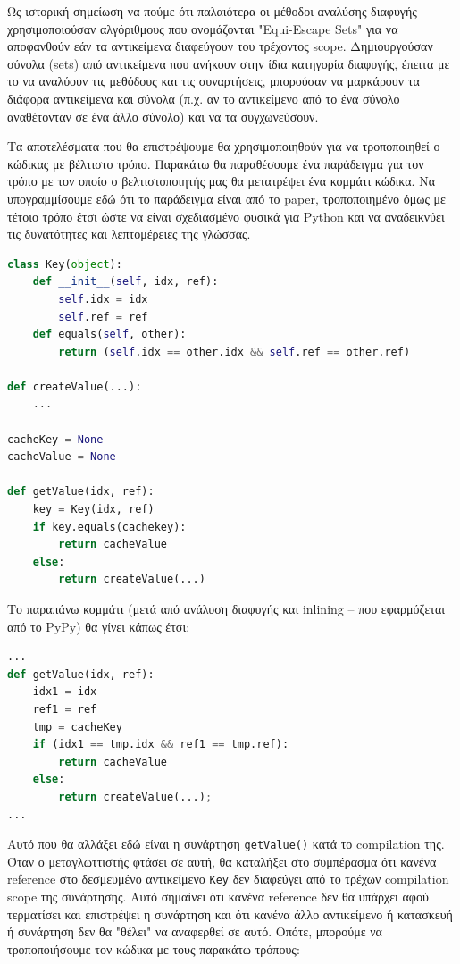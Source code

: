 Ως ιστορική σημείωση να πούμε ότι παλαιότερα οι μέθοδοι αναλύσης διαφυγής
χρησιμοποιούσαν αλγόριθμους που ονομάζονται "Equi-Escape
Sets"\cite{kotzmann2005escape} για να αποφανθούν εάν τα αντικείμενα διαφεύγουν
του τρέχοντος scope. Δημιουργούσαν σύνολα (sets) από αντικείμενα που ανήκουν
στην ίδια κατηγορία διαφυγής, έπειτα με το να αναλύουν τις μεθόδους και τις
συναρτήσεις, μπορούσαν να μαρκάρουν τα διάφορα αντικείμενα και σύνολα (π.χ. αν
το αντικείμενο από το ένα σύνολο αναθέτονταν σε ένα άλλο σύνολο) και να τα
συγχωνεύσουν.\cite{stadler2014partial}

Τα αποτελέσματα που θα επιστρέψουμε θα χρησιμοποιηθούν για να τροποποιηθεί ο
κώδικας με βέλτιστο τρόπο. Παρακάτω θα παραθέσουμε ένα παράδειγμα για τον τρόπο
με τον οποίο ο βελτιστοποιητής μας θα μετατρέψει ένα κομμάτι κώδικα. Να
υπογραμμίσουμε εδώ ότι το παράδειγμα είναι από το paper, τροποποιημένο όμως με
τέτοιο τρόπο έτσι ώστε να είναι σχεδιασμένο φυσικά για Python και να αναδεικνύει
τις δυνατότητες και λεπτομέρειες της γλώσσας.

\begin{lstlisting}[language=Python]
class Key(object):
    def __init__(self, idx, ref):
        self.idx = idx
        self.ref = ref
    def equals(self, other):
        return (self.idx == other.idx && self.ref == other.ref)

def createValue(...):
    ...
        
cacheKey = None
cacheValue = None

def getValue(idx, ref):
    key = Key(idx, ref)
    if key.equals(cachekey):
        return cacheValue
    else:
        return createValue(...)
\end{lstlisting}

Το παραπάνω κομμάτι (μετά από ανάλυση διαφυγής και inlining – που εφαρμόζεται
από το PyPy) θα γίνει κάπως έτσι:

\begin{lstlisting}[language=Python]
...
def getValue(idx, ref):
    idx1 = idx
    ref1 = ref
    tmp = cacheKey
    if (idx1 == tmp.idx && ref1 == tmp.ref):
        return cacheValue
    else:
        return createValue(...);
...

\end{lstlisting}

Αυτό που θα αλλάξει εδώ είναι η συνάρτηση \texttt{getValue()} κατά το
compilation της. Όταν ο μεταγλωττιστής φτάσει σε αυτή, θα καταλήξει στο
συμπέρασμα ότι κανένα reference στο δεσμευμένο αντικείμενο \texttt{Key} δεν
διαφεύγει από το τρέχων compilation scope της συνάρτησης. Αυτό σημαίνει ότι
κανένα reference δεν θα υπάρχει αφού τερματίσει και επιστρέψει η συνάρτηση και
ότι κανένα άλλο αντικείμενο ή κατασκευή ή συνάρτηση δεν θα "θέλει" να αναφερθεί
σε αυτό. Οπότε, μπορούμε να τροποποιήσουμε τον κώδικα με τους παρακάτω τρόπους:

